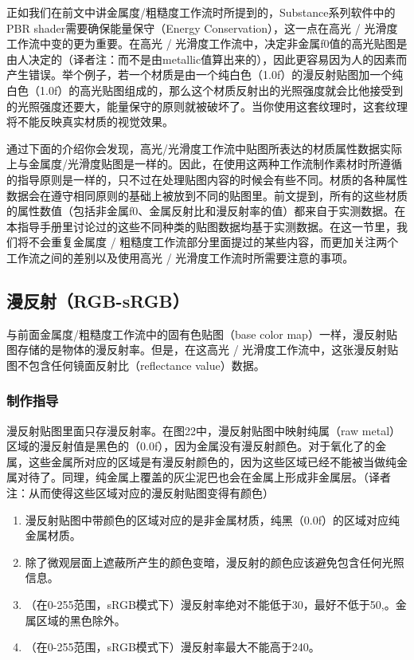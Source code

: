 正如我们在前文中讲金属度/粗糙度工作流时所提到的，Substance系列软件中的PBR shader需要确保能量保守（Energy Conservation），这一点在高光 / 光滑度工作流中变的更为重要。在高光 / 光滑度工作流中，决定非金属f0值的高光贴图是由人决定的（译者注：而不是由metallic值算出来的），因此更容易因为人的因素而产生错误。举个例子，若一个材质是由一个纯白色（1.0f）的漫反射贴图加一个纯白色（1.0f）的高光贴图组成的，那么这个材质反射出的光照强度就会比他接受到的光照强度还要大，能量保守的原则就被破坏了。当你使用这套纹理时，这套纹理将不能反映真实材质的视觉效果。

通过下面的介绍你会发现，高光/光滑度工作流中贴图所表达的材质属性数据实际上与金属度/光滑度贴图是一样的。因此，在使用这两种工作流制作素材时所遵循的指导原则是一样的，只不过在处理贴图内容的时候会有些不同。材质的各种属性数据会在遵守相同原则的基础上被放到不同的贴图里。前文提到，所有的这些材质的属性数值（包括非金属f0、金属反射比和漫反射率的值）都来自于实测数据。在本指导手册里讨论过的这些不同种类的贴图数据均基于实测数据。在这一节里，我们将不会重复金属度 / 粗糙度工作流部分里面提过的某些内容，而更加关注两个工作流之间的差别以及使用高光 / 光滑度工作流时所需要注意的事项。

\subsection{漫反射（RGB-sRGB）}

与前面金属度/粗糙度工作流中的固有色贴图（base color map）一样，漫反射贴图存储的是物体的漫反射率。但是，在这高光 / 光滑度工作流中，这张漫反射贴图不包含任何镜面反射比（reflectance value）数据。

\subsubsection{制作指导}

漫反射贴图里面只存漫反射率。在图22中，漫反射贴图中映射纯属（raw metal）区域的漫反射值是黑色的（0.0f），因为金属没有漫反射颜色。对于氧化了的金属，这些金属所对应的区域是有漫反射颜色的，因为这些区域已经不能被当做纯金属对待了。同理，纯金属上覆盖的灰尘泥巴也会在金属上形成非金属层。（译者注：从而使得这些区域对应的漫反射贴图变得有颜色）

\begin{enumerate}
\item 漫反射贴图中带颜色的区域对应的是非金属材质，纯黑（0.0f）的区域对应纯金属材质。
\item 除了微观层面上遮蔽所产生的颜色变暗，漫反射的颜色应该避免包含任何光照信息。
\item （在0-255范围，sRGB模式下）漫反射率绝对不能低于30，最好不低于50,。金属区域的黑色除外。
\item （在0-255范围，sRGB模式下）漫反射率最大不能高于240。
\end{enumerate}

